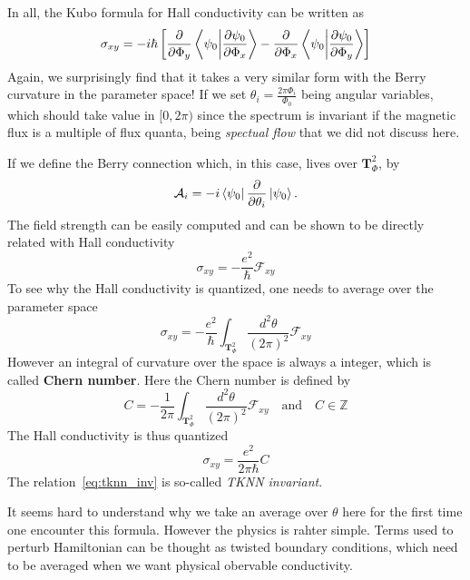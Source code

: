 \documentclass[12pt,a4paper]{article}
\numberwithin{equation}{section}
\newcommand{\pderiv}[2]{\frac{\partial #1}{\partial #2}}  %
\begin{document}
In all, the Kubo formula for Hall conductivity can be written as
\begin{equation}
    \sigma_{xy} = -i\hbar \left[\pderiv{}{\Phi_y}\bra{\psi_0}\ket{\pderiv{\psi_0}{\Phi_x}} - \pderiv{}{\Phi_x}\bra{\psi_0}\ket{\pderiv{\psi_0}{\Phi_y}}\right]
\end{equation}
Again, we surprisingly find that it takes a very similar form with the Berry curvature in the parameter space! If we set $\theta_i = \frac{2\pi\Phi_i}{\Phi_0}$ being angular variables, which should take value in $[0,2\pi)$ since 
the spectrum is invariant if the magnetic flux is a multiple of flux quanta, being \textit{spectual flow} that we did not discuss here. 

If we define the Berry connection which, in this case, lives over $\mathbf{T}_{\Phi}^2$, by
\begin{equation}
    \mathcal{A}_i = -i \bra{\psi_0} \pderiv{}{\theta_i} \ket{\psi_0}.
\end{equation}
The field strength can be easily computed and can be shown to be directly related with Hall conductivity
\begin{equation}
    \sigma_{xy} = -\frac{e^2}{\hbar}\mathcal{F}_{xy}
\end{equation}
To see why the Hall conductivity is quantized, one needs to average over the parameter space
\begin{equation}
    \sigma_{xy} = -\frac{e^2}{\hbar} \int_{\mathbf{T}_{\Phi}^2}\frac{d^2\theta}{(2\pi)^2}\mathcal{F}_{xy}
\end{equation}
However an integral of curvature over the space is always a integer, which is called \textbf{Chern number}. Here the Chern number is defined by
\begin{equation}
    C = -\frac{1}{2\pi} \int_{\mathbf{T}_{\Phi}^2}\frac{d^2\theta}{(2\pi)^2}\mathcal{F}_{xy} \quad \text{and} \quad C\in\mathbb{Z}
\end{equation}
The Hall conductivity is thus quantized
\begin{equation}
    \label{eq:tknn_inv}
    \sigma_{xy} = \frac{e^2}{2\pi\hbar} C
\end{equation}
The relation~\eqref{eq:tknn_inv} is so-called \textit{TKNN invariant}.

\begin{tcolorbox}[
    colback=orange!8,      %
    colframe=orange!70!black, %
    coltitle=white,        %
    colbacktitle=orange!80!black, %
    title={Comment: Why taking average here?},
    fonttitle=\bfseries,
    boxrule=0.8pt
]
It seems hard to understand why we take an average over $\theta$ here for the first time one encounter this formula. However the physics is rahter simple.
Terms used to perturb Hamiltonian can be thought as twisted boundary conditions, which need to be averaged when we want physical obervable conductivity.
\end{tcolorbox}
\end{document}

